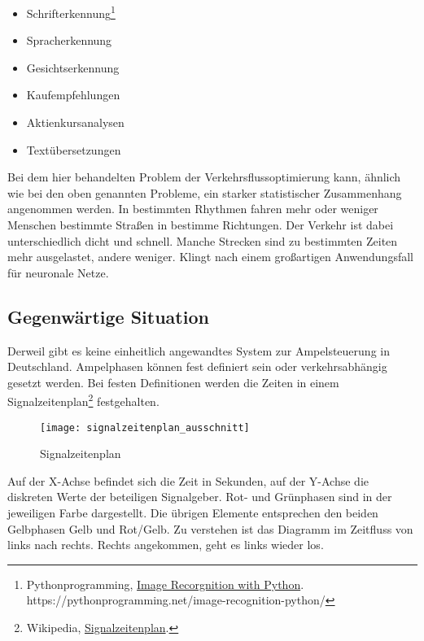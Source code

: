 \begin{multicols}{2}
\begin{itemize}
    \item Schrifterkennung\footnote{Pythonprogramming, \href{https://pythonprogramming.net/image-recognition-python/}{Image Recorgnition with Python}.\\https://pythonprogramming.net/image-recognition-python/} %
  \item Spracherkennung
  \item Gesichtserkennung
  \item Kaufempfehlungen
  \item Aktienkursanalysen
  \item Textübersetzungen
\end{itemize}
\end{multicols}

Bei dem hier behandelten Problem der Verkehrsflussoptimierung kann, ähnlich wie bei den oben genannten Probleme, ein starker statistischer Zusammenhang angenommen werden. In bestimmten Rhythmen fahren mehr oder weniger Menschen bestimmte Straßen in bestimme Richtungen. Der Verkehr ist dabei unterschiedlich dicht und schnell. Manche Strecken sind zu bestimmten Zeiten mehr ausgelastet, andere weniger. Klingt nach einem großartigen Anwendungsfall für neuronale Netze.

\subsection{Gegenwärtige Situation}

Derweil gibt es keine einheitlich angewandtes System zur Ampelsteuerung in Deutschland. Ampelphasen können fest definiert sein oder verkehrsabhängig gesetzt werden. Bei festen Definitionen werden die Zeiten in einem Signalzeitenplan\footnote{Wikipedia, \href{https://de.wikipedia.org/wiki/Signalzeitenplan}{Signalzeitenplan}.} festgehalten.

\begin{figure}[H]
    \centering
    \texttt{[image: signalzeitenplan\_ausschnitt]}
    \caption{Signalzeitenplan}
    \label{intro:signalzeitenplan}
\end{figure}

Auf der X-Achse befindet sich die Zeit in Sekunden, auf der Y-Achse die diskreten Werte der beteiligen Signalgeber. Rot- und Grünphasen sind in der jeweiligen Farbe dargestellt. Die übrigen Elemente entsprechen den beiden Gelbphasen Gelb und Rot/Gelb. Zu verstehen ist das Diagramm im Zeitfluss von links nach rechts. Rechts angekommen, geht es links wieder los.

